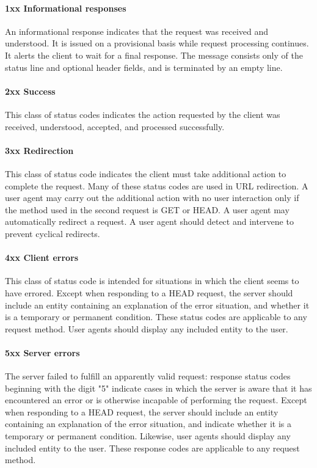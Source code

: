 \paragraph{1xx Informational responses}
An informational response indicates that the request was received and understood. It is issued on a provisional basis while request processing continues. It alerts the client to wait for a final response. The message consists only of the status line and optional header fields, and is terminated by an empty line.

\paragraph{2xx Success}
This class of status codes indicates the action requested by the client was received, understood, accepted, and processed successfully.

\paragraph{3xx Redirection}
This class of status code indicates the client must take additional action to complete the request. Many of these status codes are used in URL redirection.
A user agent may carry out the additional action with no user interaction only if the method used in the second request is GET or HEAD. A user agent may automatically redirect a request. A user agent should detect and intervene to prevent cyclical redirects.

\paragraph{4xx Client errors}
This class of status code is intended for situations in which the client seems to have errored. Except when responding to a HEAD request, the server should include an entity containing an explanation of the error situation, and whether it is a temporary or permanent condition. These status codes are applicable to any request method. User agents should display any included entity to the user.

\paragraph{5xx Server errors}
The server failed to fulfill an apparently valid request: response status codes beginning with the digit "5" indicate cases in which the server is aware that it has encountered an error or is otherwise incapable of performing the request. Except when responding to a HEAD request, the server should include an entity containing an explanation of the error situation, and indicate whether it is a temporary or permanent condition. Likewise, user agents should display any included entity to the user. These response codes are applicable to any request method.




